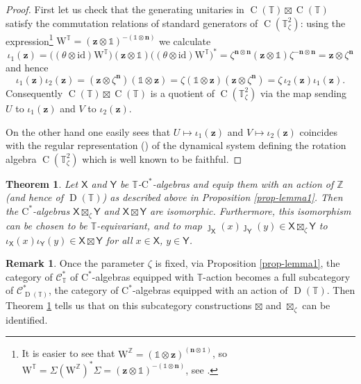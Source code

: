 \documentclass[12pt,reqno,a4paper]{amsart}
\newtheorem{theorem}[proposition]{Theorem}
\theoremstyle{definition}
\newtheorem{remark}[proposition]{Remark}
\newcommand{\cst}{\ensuremath{\mathrm{C}^*}}
\newcommand{\I}{\mathds{1}}
\newcommand{\id}{\mathrm{id}}
\newcommand{\tens}{\otimes}
\newcommand{\TT}{\mathbb{T}}
\newcommand{\ZZ}{\mathbb{Z}}
\newcommand{\sX}{\mathsf{X}}
\newcommand{\sY}{\mathsf{Y}}
\newcommand{\bn}{{\boldsymbol{n}}}
\newcommand{\bz}{{\boldsymbol{z}}}
\newcommand{\ww}{\mathrm{W}}
\DeclareMathOperator{\C}{C}
\DeclareMathOperator{\D}{D}
\numberwithin{equation}{section}
\begin{document}
\begin{appendices}
\begin{proof}
First let us check that the generating unitaries in $\C(\TT)\boxtimes\C(\TT)$ satisfy the commutation relations of standard generators of $\C(\TT^2_\zeta)$: using the expression\footnote{It is easier to see that $\ww^\ZZ=(\I\tens\bz)^{(\bn\tens\I)}$, so $\ww^\TT=\Sigma(\ww^\ZZ)^*\Sigma=(\bz\tens\I)^{-(\I\tens\bn)}$, see \cite[Introduction]{WoronowiczE2}.} $\ww^\TT=(\bz\tens\I)^{-(\I\tens\bn)}$ we calculate
\begin{equation}\label{eq-eq18}
\iota_1(\bz)=\bigl((\theta\tens\id)\ww^{\TT}\bigr)(\bz\tens\I)\bigl((\theta\tens\id)\ww^{\TT}\bigr)^*=\zeta^{\bn\tens\bn}(\bz\tens\I)\zeta^{-\bn\tens\bn}=\bz\tens\zeta^{\bn}
\end{equation}
and hence
\[
\iota_1(\bz)\iota_2(\bz)=(\bz\tens\zeta^{\bn})(\I\tens\bz)
=\zeta(\I\tens\bz)(\bz\tens\zeta^{\bn})
=\zeta\,\iota_2(\bz)\iota_1(\bz).
\]
Consequently $\C(\TT)\boxtimes\C(\TT)$ is a quotient of $\C(\TT^2_\zeta)$ via the map sending $U$ to $\iota_1(\bz)$ and $V$ to $\iota_2(\bz)$.

On the other hand one easily sees that $U\mapsto\iota_1(\bz)$ and $V\mapsto\iota_2(\bz)$ coincides with the regular representation (\cite[Section 2.2]{Williams}) of the dynamical system defining the rotation algebra $\C(\TT^2_\zeta)$ which is well known to be faithful.
\end{proof}

\begin{theorem}\label{thm2}
Let $\sX$ and $\sY$ be $\TT$-\cst-algebras and equip them with an action of $\ZZ$ (and hence of $\D(\TT)$) as described above in Proposition \ref{prop-lemma1}. Then the \cst-algebras $\sX\boxtimes_\zeta\sY$ and $\sX\boxtimes\sY$ are isomorphic. Furthermore, this isomorphism can be chosen to be $\TT$-equivariant, and to map $\jmath_\sX(x)\jmath_\sY(y)\in\sX\boxtimes_\zeta\sY$ to $\iota_\sX(x)\iota_\sY(y)\in\sX\boxtimes\sY$ for all $x\in\sX$, $y\in\sY$.
\end{theorem}

\begin{remark}\label{rem1}
 Once the parameter $\zeta$ is fixed, via Proposition \ref{prop-lemma1}, the category of $\mathcal{C}^*_{\TT}$ of \cst-algebras equipped with $\TT$-action becomes a full subcategory of $\mathcal{C}^*_{\D(\TT)}$, the category of \cst-algebras equipped with an action of $\D(\TT)$. Then Theorem \ref{thm2} tells us that on this subcategory constructions $\boxtimes$ and $\boxtimes_{\zeta}$ can be identified.


\end{remark}
\end{appendices}
\end{document}
